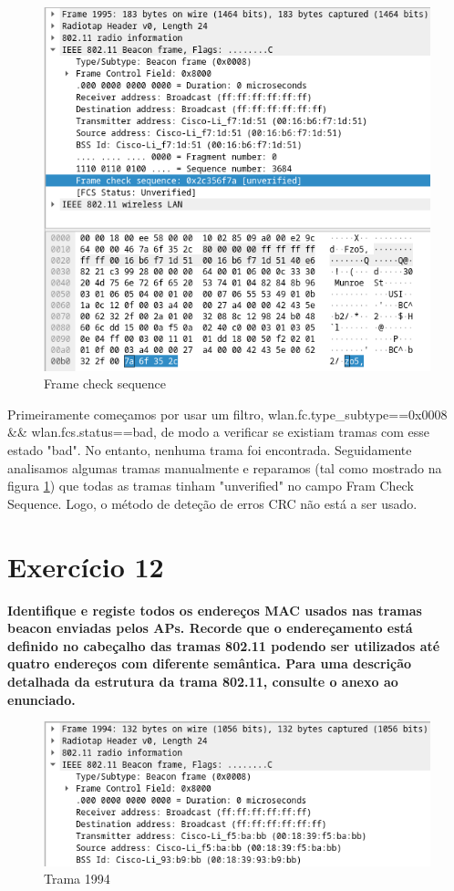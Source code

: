 \documentclass[a4paper]{report}
\begin{document}
\begin{figure}[H]
    \centering 
    \includegraphics[width=\textwidth]{images/erroEx11.png}  
    \caption{Frame check sequence}
    \label{fig:erroEx11}
\end{figure}
Primeiramente começamos por usar um filtro, wlan.fc.type\_subtype==0x0008 \&\&
wlan.fcs.status==bad, de modo a verificar se existiam tramas com esse estado
"bad". No entanto, nenhuma trama foi encontrada. Seguidamente analisamos algumas
tramas manualmente e reparamos (tal como mostrado na figura \ref{fig:erroEx11})
que todas as tramas tinham "unverified" no campo Fram Check Sequence. Logo, o
método de deteção de erros CRC não está a ser usado.

\section{Exercício 12}
\textbf{Identifique e registe todos os endereços MAC usados nas tramas beacon
enviadas pelos APs. Recorde que o endereçamento está definido no cabeçalho
das tramas 802.11 podendo ser utilizados até quatro endereços com diferente
semântica. Para uma descrição detalhada da estrutura da trama 802.11,
consulte o anexo ao enunciado.}

\begin{figure}[H]
    \centering 
    \includegraphics[width=\textwidth]{images/trama1994Ex12.png}  
    \caption{Trama 1994}
    \label{fig:trama1994Ex12}
\end{figure}
\end{document}
